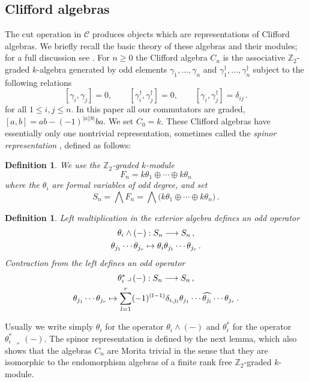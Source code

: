 \documentclass[english,letter paper,12pt,leqno]{article}
\theoremstyle{example}
\newtheorem{definition}[theorem]{Definition}
\numberwithin{equation}{section}
\def\be{\begin{equation}}
\def\ee{\end{equation}}
\def\nZ{\mathds{Z}}
\def\L{\mathcal{C}}
\def\ferm{\gamma}
\def\fermc{\gamma^\dagger}
\begin{document}
\subsection{Clifford algebras}\label{section:clifford_algs}

The cut operation in $\L$ produces objects which are representations of Clifford algebras. We briefly recall the basic theory of these algebras and their modules; for a full discussion see \cite{friedrich}. For $n \ge 0$ the Clifford algebra $C_n$ is the associative $\mathbb{Z}_2$-graded $k$-algebra generated by odd elements $\ferm_1,\ldots,\ferm_n$ and $\fermc_1, \ldots, \fermc_n$ subject to the following relations
\be\label{eq:clifford_relations}
[\ferm_i, \ferm_j] = 0, \qquad [\fermc_i, \fermc_j] = 0, \qquad [\ferm_i, \fermc_j] = \delta_{ij}\,.
\ee
for all $1 \le i, j \le n$. In this paper all our commutators are graded, $[a,b] = ab - (-1)^{|a||b|} ba$. We set $C_0 = k$. These Clifford algebras have essentially only one nontrivial representation, sometimes called the \emph{spinor representation} \cite[p.14]{friedrich}, defined as follows:

\begin{definition} We use the $\nZ_2$-graded $k$-module
\be
F_n = k \theta_1 \oplus \cdots \oplus k \theta_n
\ee
where the $\theta_i$ are formal variables of odd degree, and set
\be
S_n = \bigwedge F_n = \bigwedge\big( k \theta_1 \oplus \cdots \oplus k \theta_n \big)\,.
\ee
\end{definition}

\begin{definition}\label{defn:contraction} Left multiplication in the exterior algebra defines an odd operator
\begin{gather*}
\theta_i \wedge (-): S_n \longrightarrow S_n\,,\\
\theta_{j_1} \cdots \theta_{j_r} \mapsto \theta_i \theta_{j_1} \cdots \theta_{j_r}\,.
\end{gather*}
Contraction from the left defines an odd operator
\begin{gather*}
\theta_i^*\, \lrcorner\, (-): S_n \longrightarrow S_n\,,\\
\theta_{j_1} \cdots \theta_{j_r} \mapsto \sum_{l=1}^r (-1)^{(l-1)} \delta_{i,j_l} \theta_{j_1} \cdots \widehat{ \theta_{j_l} } \cdots \theta_{j_r}\,.
\end{gather*}
\end{definition}

Usually we write simply $\theta_i$ for the operator $\theta_i \wedge (-)$ and $\theta_i^*$ for the operator $\theta_i^*\, \lrcorner\, (-)$. The spinor representation is defined by the next lemma, which also shows that the algebras $C_n$ are Morita trivial in the sense that they are isomorphic to the endomorphism algebras of a finite rank free $\mathbb{Z}_2$-graded $k$-module.
\end{document}
